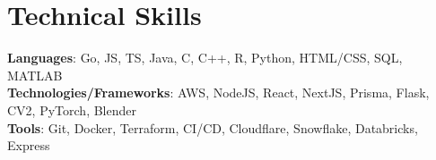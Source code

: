 \documentclass[letterpaper,11pt]{article}
\makeatletter
\newcommand{\resumeItem}[1]{
  \item\small{
    {#1 \vspace{-2pt}}
  }
}
\newcommand{\resumeSubheading}[4]{
  \vspace{-2pt}\item
    \begin{tabular*}{1.0\textwidth}[t]{l@{\extracolsep{\fill}}r}
      \small#1 & \textbf{\small #2} \\
      \textit{\small#3} & \textit{\small #4} \\
    \end{tabular*}\vspace{-9pt}
}
\newcommand{\resumeSubHeadingListStart}{\begin{itemize}[leftmargin=0.0in, label={}]}
\newcommand{\resumeItemListStart}{\begin{itemize}}
\newcommand{\resumeItemListEnd}{\end{itemize}\vspace{-5pt}}
\makeatother
\begin{document}
\section{Technical Skills}
 \begin{itemize}[leftmargin=0.15in, label={}]
    \small{\item{
      \begin{comment}
        Languages:
        - Go
        - JavaScript
        - TypeScript
        - C
        - C++
        - Java
        - Rust
        - R
        - Python
        - HTML/CSS
        - SQL
        - MATLAB

        Technologies/Frameworks:
        - Linux
        - Bootstrap
        - NextJS
        - React
        - Prisma
        - Flask
        - Node
        - CV2
        - AWS
        - PyTorch
        - Blender

        Tools:
        - Git
        - Docker
        - Terraform
        - CI/CD
        - AWS
        - Cloudflare
        - Snowflake
        - Databricks
        - Express
      \end{comment}
      \textbf{Languages}{: Go, JS, TS, Java, C, C++, R, Python, HTML/CSS, SQL, MATLAB} \\
      \textbf{Technologies/Frameworks}{: AWS, NodeJS, React, NextJS, Prisma, Flask, CV2, PyTorch, Blender} \\
      \textbf{Tools}{: Git, Docker, Terraform, CI/CD, Cloudflare, Snowflake, Databricks, Express} \\
    }}
 \end{itemize}
\vspace{-15pt}


        
\end{document}
